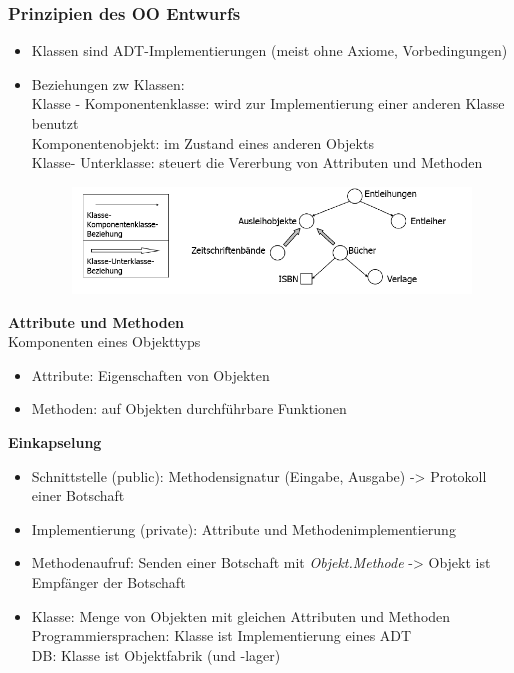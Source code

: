 \subsubsection{Prinzipien des OO Entwurfs}
\begin{itemize}
	\item Klassen sind ADT-Implementierungen (meist ohne Axiome, Vorbedingungen)
	\item Beziehungen zw Klassen:\\
	Klasse - Komponentenklasse: wird zur Implementierung einer anderen Klasse benutzt\\
	Komponentenobjekt: im  Zustand eines anderen Objekts\\
	Klasse- Unterklasse: steuert die Vererbung von Attributen und Methoden
	\begin{figure}[!h]
		\centering
		\includegraphics[scale=0.5]{img/adt_inherit_components.png}
	\end{figure}
\end{itemize}

\textbf{Attribute und Methoden}\\
Komponenten eines Objekttyps
\begin{itemize}
	\item Attribute: Eigenschaften von Objekten
	\item Methoden: auf Objekten durchführbare Funktionen
\end{itemize}

\textbf{Einkapselung}
\begin{itemize}
 	\item Schnittstelle (public): Methodensignatur (Eingabe, Ausgabe) -> Protokoll einer Botschaft
	\item Implementierung (private): Attribute und Methodenimplementierung
	\item Methodenaufruf: Senden einer Botschaft mit \textit{Objekt.Methode} -> Objekt ist Empfänger der Botschaft
	\item Klasse: Menge von Objekten mit gleichen Attributen und Methoden\\
	Programmiersprachen: Klasse ist Implementierung eines ADT\\
	DB: Klasse ist Objektfabrik (und -lager)
\end{itemize}

